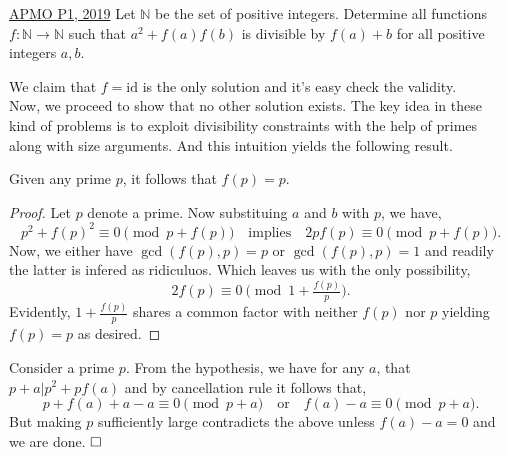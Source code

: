 \begin{problem}{2}{\href{https://artofproblemsolving.com/community/c6h1854148p12519631}{APMO P1, 2019}}
	Let $\mathbb{N}$ be the set of positive integers. Determine all functions $f:\mathbb{N}\to\mathbb{N}$ such that $a^2+f(a)f(b)$ is divisible by $f(a)+b$ for all positive integers $a,b$.
	\begin{solution} We claim that $f=\text{id}$ is the only solution and it's easy check the validity.\\
		\indent Now, we proceed to show that no other solution exists. The key idea in these kind of problems is to exploit divisibility constraints with the help of primes along with size arguments. And this intuition yields the following result.
		
		\begin{claim}
			Given any prime $p$, it follows that $f(p)=p$.
		\end{claim}
		\begin{proof}
			Let $p$ denote a prime. Now substituing $a$ and $b$ with $p$, we have,
			\[p^2+f(p)^2\equiv 0\pmod{p+f(p)}\quad\text{implies}\quad 2pf(p)\equiv 0\pmod{p+f(p)} .\]
			Now, we either have $\gcd(f(p), p)=p$ or $\gcd(f(p), p)=1$ and readily the latter is infered as ridiculuos. Which leaves us with the only possibility,
			\[2f(p)\equiv 0\pmod{1+\tfrac{f(p)}{p}}.\]
			Evidently, $1+\tfrac{f(p)}{p}$ shares a common factor with neither $f(p)$ nor $p$ yielding $f(p)=p$ as desired.
		\end{proof}
		
		\noindent Consider a prime $p$. From the hypothesis, we have for any $a$, that $p+a\lvert p^2+pf(a)$ and by cancellation rule it follows that,
		\[p+f(a)+a-a\equiv 0\pmod {p+a}\quad\text{or}\quad f(a)-a\equiv 0\pmod{p+a}.\]
		But making $p$ sufficiently large contradicts the above unless $f(a)-a=0$ and we are done. $\qedwhite$
	\end{solution}
\end{problem}
	

